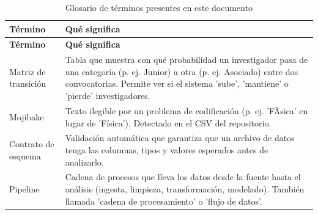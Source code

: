 \begingroup
\small
\setlength{\tabcolsep}{3pt}
\begin{longtable}{>{\raggedright\arraybackslash}p{4.3cm}>{\raggedright\arraybackslash}p{9.8cm}}
\caption{Glosario de términos presentes en este documento}
\label{tab:glosario}\\
\toprule
\textbf{Término} & \textbf{Qué significa} \\
\midrule
\endfirsthead
\toprule
\textbf{Término} & \textbf{Qué significa} \\
\midrule
\endhead
    Matriz de transición & Tabla que muestra con qué probabilidad un investigador pasa de una categoría (p. ej. Junior) a otra (p. ej. Asociado) entre dos convocatorias. Permite ver si el sistema 'sube', 'mantiene' o 'pierde' investigadores.
 \\
    Mojibake & Texto ilegible por un problema de codificación (p. ej. 'FÃ­sica' en lugar de 'Física'). Detectado en el CSV del repositorio.
 \\
    Contrato de esquema & Validación automática que garantiza que un archivo de datos tenga las columnas, tipos y valores esperados antes de analizarlo.
 \\
    Pipeline & Cadena de procesos que lleva los datos desde la fuente hasta el análisis (ingesta, limpieza, transformación, modelado). También llamada 'cadena de procesamiento' o 'flujo de datos'.
 \\
\bottomrule
\end{longtable}
\endgroup
